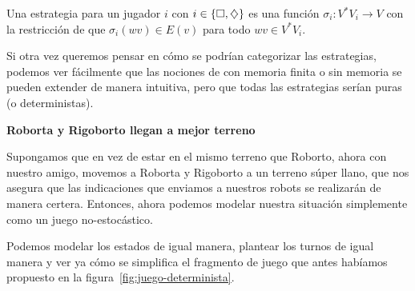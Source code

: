 \begin{definition}
	Una estrategia para un jugador $i$ con $i \in \{\square, \diamondsuit\}$ es una función $\sigma_i: V^*V_i \rightarrow V$ con la restricción de que $\sigma_i(wv) \in E(v)$ para todo $wv \in V^*V_i$.
\end{definition}

Si otra vez queremos pensar en cómo se podrían categorizar las estrategias,
podemos ver fácilmente que las nociones de con memoria finita o sin memoria se
pueden extender de manera intuitiva, pero que todas las estrategias serían
puras (o deterministas).





\textbf{Roborta y Rigoborto llegan a mejor terreno}

Supongamos que en vez de estar en el mismo terreno que Roborto, ahora con
nuestro amigo, movemos a Roborta y Rigoborto a un terreno súper llano, que nos
asegura que las indicaciones que enviamos a nuestros robots se realizarán de
manera certera. Entonces, ahora podemos modelar nuestra situación simplemente
como un juego no-estocástico.

Podemos modelar los estados de igual manera, plantear los turnos de igual
manera y ver ya cómo se simplifica el fragmento de juego que antes habíamos
propuesto en la figura~\ref{fig:juego-determinista}.

